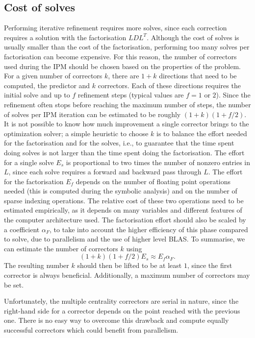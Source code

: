 \documentclass[a4paper]{article}
\newcommand{\0}{\mathbf 0}
\begin{document}
\subsection{Cost of solves}
\label{sec:correctors}

Performing iterative refinement requires more solves, since each correction requires a solution with the factorisation $LDL^T$. Although the cost of solves is usually smaller than the cost of the factorisation, performing too many solves per factorisation can become expensive. For this reason, the number of correctors used during the IPM should be chosen based on the properties of the problem. For a given number of correctors $k$, there are $1+k$ directions that need to be computed, the predictor and $k$ correctors. Each of these directions requires the initial solve and up to $f$ refinement steps (typical values are $f=1$ or $2$).
 Since the refinement often stops before reaching the maximum number of steps, the number of solves per IPM iteration can be estimated to be roughly $(1+k)(1+f/2)$. It is not possible to know how much improvement a single corrector brings to the optimization solver; a simple heuristic to choose $k$ is to balance the effort needed for the factorisation and for the solves, i.e., to guarantee that the time spent doing solves is not larger than the time spent doing the factorisation. 
 The effort for a single solve $E_s$ is proportional to two times the number of nonzero entries in $L$, since each solve requires a forward and backward pass through $L$. The effort for the factorisation $E_f$ depends on the number of floating point operations needed (this is computed during the symbolic analysis) and on the number of sparse indexing operations. The relative cost of these two operations need to be estimated empirically, as it depends on many variables and different features of the computer architecture used. The factorisation effort should also be scaled by a coefficient $\alpha_F$, to take into account the higher efficiency of this phase compared to solve, due to parallelism and the use of higher level BLAS. To summarise, we can estimate the number of correctors $k$ using
 \[(1+k)(1+f/2) E_s \approx E_f  \alpha_F. \]
The resulting number $k$ should then be lifted to be at least $1$, since the first corrector is always beneficial. Additionally, a maximum number of correctors may be set.

Unfortunately, the multiple centrality correctors \cite{ColGon:mcc} are serial in nature, since the right-hand side for a corrector depends on the point reached with the previous one. There is no easy way to overcome this drawback and compute equally successful correctors which could benefit from parallelism.
\end{document}
